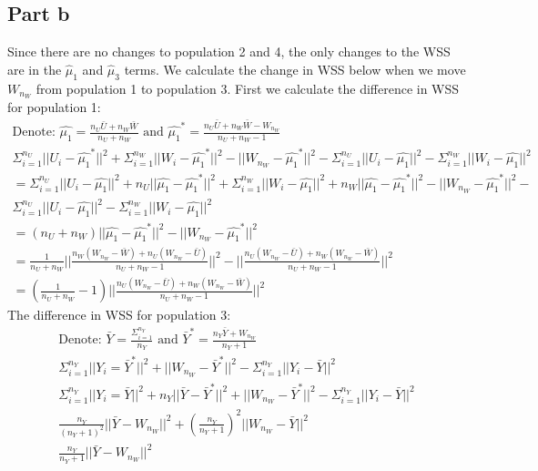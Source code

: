 \documentclass{article}\usepackage[]{graphicx}\usepackage[]{color}
\begin{document}
\subsection*{Part b}
Since there are no changes to population 2 and 4, the only changes to the WSS are in the $\hat{\mu}_1$ and $\hat{\mu}_3$ terms.  We calculate the change in WSS below when we move $W_{n_W}$ from population 1 to population 3.  First we calculate the difference in WSS for population 1:
\begin{align*}
\text{Denote: } \hat{\mu_1} = \frac{n_U\bar{U} + n_W\bar{W}}{n_U + n_W} \text{ and } \hat{\mu_1}^* = \frac{n_U\bar{U} + n_W\bar{W} - W_{n_W}}{n_U + n_W - 1}\\
\Sigma_{i=1}^{n_U}||U_i - \hat{\mu_1}^*||^2 + \Sigma_{i=1}^{n_W}||W_i - \hat{\mu_1}^*||^2 - ||W_{n_W} - \hat{\mu_1}^*||^2 - \Sigma_{i=1}^{n_U}||U_i - \hat{\mu_1}||^2 - \Sigma_{i=1}^{n_W}||W_i - \hat{\mu_1}||^2\\
= \Sigma_{i=1}^{n_U}||U_i - \hat{\mu_1}||^2 + n_U||\hat{\mu_1} - \hat{\mu_1}^*||^2 + \Sigma_{i=1}^{n_W}||W_i - \hat{\mu_1}||^2 + n_W||\hat{\mu_1} - \hat{\mu_1}^*||^2 - ||W_{n_W} - \hat{\mu_1}^*||^2 - \\
\Sigma_{i=1}^{n_U}||U_i - \hat{\mu_1}||^2 - \Sigma_{i=1}^{n_W}||W_i - \hat{\mu_1}||^2\\
= (n_U + n_W)||\hat{\mu_1} - \hat{\mu_1}^*||^2 - ||W_{n_W} - \hat{\mu_1}^*||^2 \\
= \frac{1}{n_U + n_W}||\frac{n_W(W_{n_W} - \bar{W}) + n_U(W_{n_W} - \bar{U})}{n_U + n_W - 1}||^2 - ||\frac{n_U(W_{n_W} - \bar{U}) + n_W(W_{n_W} - \bar{W})}{n_U + n_W - 1}||^2\\
= (\frac{1}{n_U + n_W} - 1)||\frac{n_U(W_{n_W} - \bar{U}) + n_W(W_{n_W} - \bar{W})}{n_U + n_W - 1}||^2
\end{align*}
The difference in WSS for population 3:
\begin{align*}
\text{Denote: } \bar{Y} = \frac{\Sigma_{i=1}^{n_Y}}{n_Y} \text{ and } \bar{Y}^* = \frac{n_Y\bar{Y} + W_{n_W}}{n_Y + 1}\\
\Sigma_{i=1}^{n_Y}||Y_i = \bar{Y}^*||^2 + ||W_{n_W} - \bar{Y}^*||^2 - \Sigma_{i=1}^{n_Y}||Y_i - \bar{Y}||^2\\
\Sigma_{i=1}^{n_Y}||Y_i = \bar{Y}||^2 + n_Y||\bar{Y} - \bar{Y}^*||^2 + ||W_{n_W} - \bar{Y}^*||^2 - \Sigma_{i=1}^{n_Y}||Y_i - \bar{Y}||^2\\
\frac{n_Y}{(n_Y + 1)^2}||\bar{Y} - W_{n_W}||^2 + (\frac{n_Y}{n_Y + 1})^2||W_{n_W} - \bar{Y}||^2\\
\frac{n_Y}{n_Y + 1}||\bar{Y} - W_{n_W}||^2
\end{align*}
\end{document}

